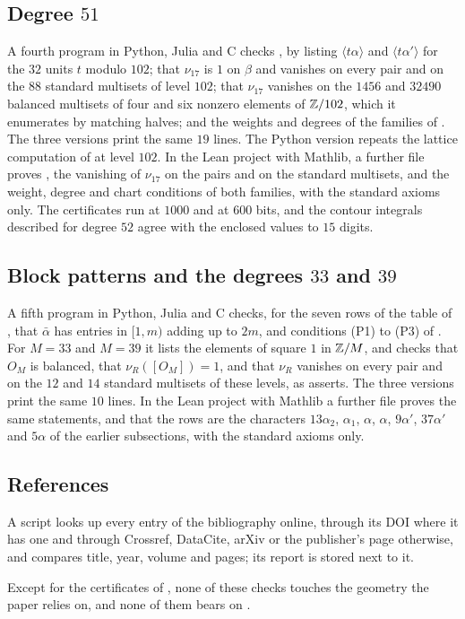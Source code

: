 \subsection*{Degree \texorpdfstring{$51$}{51}}
A fourth program in Python, Julia and C checks , by listing
$\langle t\alpha\rangle$ and $\langle t\alpha'\rangle$ for the $32$ units
$t$ modulo $102$; that $\nu_{17}$ is $1$ on $\beta$ and vanishes on every
pair and on the $88$ standard multisets of level $102$; that $\nu_{17}$
vanishes on the $1456$ and $32490$ balanced multisets of four and six
nonzero elements of $\mathbb{Z}/102$, which it enumerates by matching halves; and
the weights and degrees of the families of
. The three versions print the same $19$
lines. The Python version repeats the lattice computation of
 at level $102$. In the Lean project with Mathlib, a
further file proves , the vanishing of $\nu_{17}$ on the
pairs and on the standard multisets, and the weight, degree and chart
conditions of both families, with the standard axioms only. The
certificates run at
$1000$ and at $600$ bits, and the contour integrals described for degree
$52$ agree with the enclosed values to $15$ digits.

\subsection*{Block patterns and the degrees \texorpdfstring{$33$}{33} and \texorpdfstring{$39$}{39}}
A fifth program in Python, Julia and C checks, for the seven rows of the
table of , that $\bar\alpha$ has entries in $[1,m)$
adding up to $2m$, and conditions (P1) to (P3) of .
For $M=33$ and $M=39$ it lists the elements of square $1$ in $\mathbb{Z}/M$, and
checks that $O_{M}$ is balanced, that $\nu_{R}([O_{M}])=1$, and that
$\nu_{R}$ vanishes on every pair and on the $12$ and $14$ standard
multisets of these levels, as  asserts. The three versions
print the same $10$ lines. In the Lean project with Mathlib a further file
proves the same statements, and that the rows are the characters
$13\alpha_{2}$, $\alpha_{1}$, $\alpha$, $\alpha$, $9\alpha'$, $37\alpha'$
and $5\alpha$ of the earlier subsections, with the standard axioms only.

\subsection*{References}
A script looks up every entry of
the bibliography online, through its DOI where it has one and through
Crossref, DataCite, arXiv or the publisher's page otherwise, and compares
title, year, volume and pages; its report is stored next to it.

Except for the certificates of , none of these checks
touches the geometry the paper relies on, and none of them bears on
.
